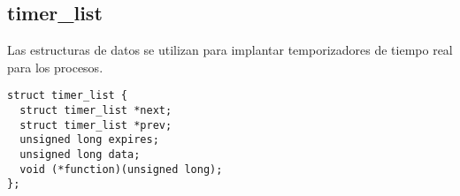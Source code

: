 \subsection*{timer\_list}
Las estructuras de datos  se utilizan para implantar
temporizadores de tiempo real para los procesos.
\begin{tscreen}\begin{verbatim}
struct timer_list {
  struct timer_list *next;
  struct timer_list *prev;
  unsigned long expires;
  unsigned long data;
  void (*function)(unsigned long);
};
\end{verbatim}\end{tscreen}


